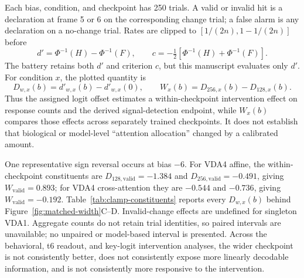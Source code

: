 \documentclass[11pt,a4paper]{article}
\begin{document}
Each bias, condition, and checkpoint has 250 trials. A valid or invalid hit is a declaration at frame 5 or 6 on the corresponding change trial; a false alarm is any declaration on a no-change trial. Rates are clipped to $[1/(2n),1-1/(2n)]$ before
\begin{equation}
d'=\Phi^{-1}(H)-\Phi^{-1}(F), \qquad c=-\tfrac12\left[\Phi^{-1}(H)+\Phi^{-1}(F)\right].
\end{equation}
The battery retains both $d'$ and criterion $c$, but this manuscript evaluates only $d'$. For condition $x$, the plotted quantity is
\begin{equation}
D_{w,x}(b)=d'_{w,x}(b)-d'_{w,x}(0),\qquad
W_x(b)=D_{256,x}(b)-D_{128,x}(b).
\end{equation}
Thus the assigned logit offset estimates a within-checkpoint intervention effect on response counts and the derived signal-detection endpoint, while $W_x(b)$ compares those effects across separately trained checkpoints. It does not establish that biological or model-level ``attention allocation'' changed by a calibrated amount.

One representative sign reversal occurs at bias $-6$. For VDA4 affine, the within-checkpoint constituents are $D_{128,\mathrm{valid}}=-1.384$ and $D_{256,\mathrm{valid}}=-0.491$, giving $W_{\mathrm{valid}}=0.893$; for VDA4 cross-attention they are $-0.544$ and $-0.736$, giving $W_{\mathrm{valid}}=-0.192$. Table~\ref{tab:clamp-constituents} reports every $D_{w,x}(b)$ behind Figure~\ref{fig:matched-width}C--D. Invalid-change effects are undefined for singleton VDA1. Aggregate counts do not retain trial identities, so paired intervals are unavailable; no unpaired or model-based interval is presented. Across the behavioral, t6 readout, and key-logit intervention analyses, the wider checkpoint is not consistently better, does not consistently expose more linearly decodable information, and is not consistently more responsive to the intervention.
\end{document}
